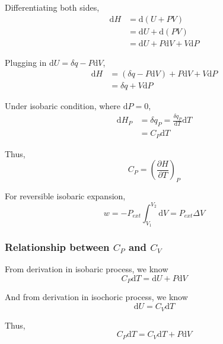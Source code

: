 \documentclass[letterpaper]{article}
\newcommand{\diff}{\mathrm{d}}
\begin{document}
Differentiating both sides,
\begin{equation*}
    \begin{aligned}
        \diff H & =\diff (U+PV)              \\
                & =\diff U+\diff (PV)        \\
                & =\diff U+P\diff V+V\diff P
    \end{aligned}
\end{equation*}

Plugging in $\diff U=\delta q-P\diff V$,
\begin{equation*}
    \begin{aligned}
        \diff H & =(\delta q-P\diff V)+P\diff V+V\diff P \\
                & =\delta q+V\diff P
    \end{aligned}
\end{equation*}

Under isobaric condition, where $\diff P=0$,
\begin{equation*}
    \begin{aligned}
        \diff H_P & =\delta q_P=\frac{\delta q_P}{\diff T}\diff T \\
                  & =C_P\diff T
    \end{aligned}
\end{equation*}

Thus,
\begin{equation*}
    \boxed{C_P=(\frac{\partial H}{\partial T})_P}
\end{equation*}

For reversible isobaric expansion,
\begin{equation*}
    w=-P_{ext}\int_{V_1}^{V_2}\diff V=P_{ext}\Delta V
\end{equation*}
\subsubsection*{Relationship between $C_P$ and $C_V$}
From derivation in isobaric process, we know
\begin{equation*}
    C_P\diff T=\diff U+P\diff V
\end{equation*}

And from derivation in isochoric process, we know
\begin{equation*}
    \diff U=C_V\diff T
\end{equation*}

Thus,
\begin{equation*}
    C_P\diff T=C_V\diff T+P\diff V
\end{equation*}
\end{document}
